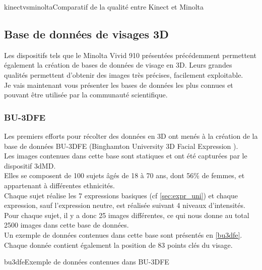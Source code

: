 \documentclass[poster]{polytech/polytech}
\begin{document}
\begin{Figure}{kinectvsminolta}{Comparatif de la qualité entre Kinect et Minolta}
\end{Figure}

\newpage
\subsection{Base de données de visages 3D}
\label{bdd3d}
Les dispositifs tels que le Minolta Vivid 910 présentées précédemment permettent également la création de bases de données de visage en 3D. Leurs grandes qualités permettent d'obtenir des images très précises, facilement exploitable.\\
Je vais maintenant vous présenter les bases de données les plus connues et pouvant être utilisée par la communauté scientifique.

\subsubsection{BU-3DFE}
Les premiers efforts pour récolter des données en 3D ont menés à la création de la base de données BU-3DFE (Binghamton University 3D Facial Expression \cite{bu3dfe_article}).\\
Les images contenues dans cette base sont statiques et ont été capturées par le dispositif 3dMD.\\
Elles se composent de 100 sujets âgés de 18 à 70 ans, dont 56\% de femmes, et appartenant à différentes ethnicités.\\
Chaque sujet réalise les 7 expressions basiques (cf \autoref{sec:expr_uni}) et chaque expression, sauf l'expression neutre, est réalisée suivant 4 niveaux d'intensités. Pour chaque sujet, il y a donc 25 images différentes, ce qui nous donne au total 2500 images dans cette base de données.\\
Un exemple de données contenues dans cette base sont présentés en \autoref{bu3dfe}.\\
Chaque donnée contient également la position de 83 points clés du visage.

\begin{Figure}{bu3dfe}{Exemple de données contenues dans BU-3DFE}
\end{Figure}
\end{document}

